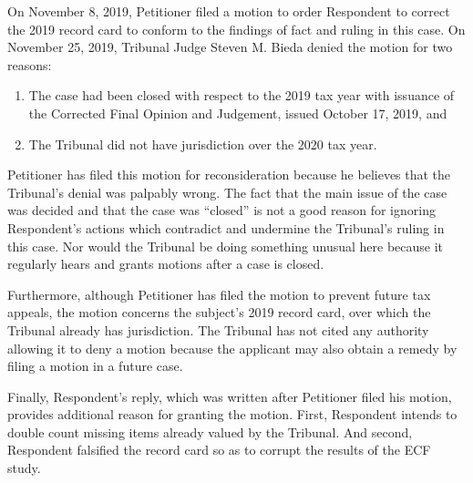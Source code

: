 \documentclass[12pt,\documentclassflag]{michiganCourtOfAppealsBrief}
\begin{document}
On November 8, 2019, Petitioner filed a motion to order Respondent to correct the 2019 record card to conform to the findings of fact and ruling in this case.
On November 25, 2019, Tribunal Judge Steven M. Bieda denied the motion for two reasons:

\begin{enumerate}
\item The case had been closed with respect to the 2019 tax year with issuance of the Corrected Final Opinion and Judgement, issued October 17, 2019, and
\item The Tribunal did not have jurisdiction over the 2020 tax year.
\end{enumerate}

Petitioner has filed this motion for reconsideration because he believes that the Tribunal's denial was palpably wrong. The fact that the main issue of the case was decided and that the case was ``closed'' is not a good reason for ignoring Respondent's actions which contradict and undermine the Tribunal's ruling in this case. Nor would the Tribunal be doing something unusual here because it regularly hears and grants motions after a case is closed.

Furthermore, although Petitioner has filed the motion to prevent future tax appeals, the motion concerns the subject's 2019 record card, over which the Tribunal already has jurisdiction. The Tribunal has not cited any authority allowing it to deny a motion because the applicant may also obtain a remedy by filing a motion in a future case.

Finally, Respondent's reply, which was written after Petitioner filed his motion, provides additional reason for granting the motion. First, Respondent intends to double count missing items already valued by the Tribunal. And second,  Respondent falsified the record card so as to corrupt the results of the ECF study.



\end{document}
